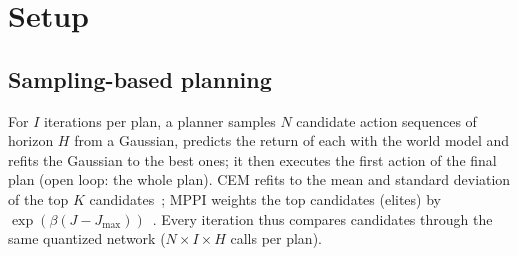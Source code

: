 \documentclass[10pt]{article}
\begin{document}
\section{Setup}
\label{sec:setup}

\subsection{Sampling-based planning}
For $I$ iterations per plan, a planner samples $N$ candidate action sequences of horizon $H$ from a Gaussian, predicts the return of each with the world model and refits the Gaussian to the best ones; it then executes the first action of the final plan (open loop: the whole plan). CEM refits to the mean and standard deviation of the top $K$ candidates~\citep{rubinstein1999cem}; MPPI weights the top candidates (elites) by $\exp(\beta(J-J_{\max}))$~\citep{williams2017mppi}. Every iteration thus compares candidates through the same quantized network ($N\times I\times H$ calls per plan).
\end{document}
